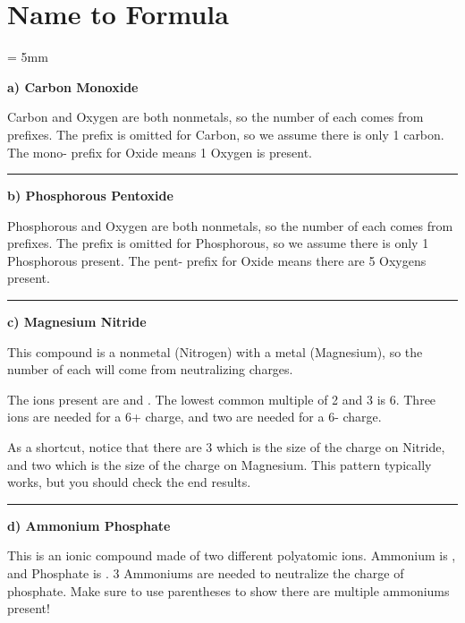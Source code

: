 \documentclass[12pt, oneside, letterpaper]{book}
\begin{document}
%
\pagestyle{fancy} %
\renewcommand{\headrulewidth}{0pt}
\fancyhead{}
\fancyhead[R]{\thepage}
\fancyfoot{} %
\renewcommand{\footrulewidth}{0.1pt}
%
%
\section{Name to Formula}

\parskip = 5mm 

\textbf{a) Carbon Monoxide}

Carbon and Oxygen are both nonmetals, so the number of each comes from prefixes. The prefix is omitted for Carbon, so we assume there is only 1 carbon. The mono- prefix for Oxide means 1 Oxygen is present. 

\hrule

\textbf{b) Phosphorous Pentoxide}

Phosphorous and Oxygen are both nonmetals, so the number of each comes from prefixes. The prefix is omitted for Phosphorous, so we assume there is only 1 Phosphorous present. The pent- prefix for Oxide means there are 5 Oxygens present. 



\hrule

\textbf{c) Magnesium Nitride}

This compound is a nonmetal (Nitrogen) with a metal (Magnesium), so the number of each will come from neutralizing charges. 

The ions present are  and . The lowest common multiple of 2 and 3 is 6. Three  ions are needed for a 6+ charge, and two  are needed for a 6- charge. 



As a shortcut, notice that there are 3  which is the size of the charge on Nitride, and two  which is the size of the charge on Magnesium. This pattern typically works, but you should check the end results. 

\hrule

\textbf{d) Ammonium Phosphate}

This is an ionic compound made of two different polyatomic ions. Ammonium is , and Phosphate is . 3 Ammoniums are needed to neutralize the charge of phosphate. Make sure to use parentheses to show there are multiple ammoniums present!
\end{document}
